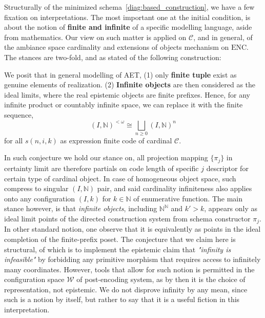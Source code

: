 Structurally of the minimized schema~\ref{diag:based_construction}, we have a few fixation on interpretations. The most important one at the initial condition, is about the notion of \textbf{finite and infinite} of a specific modelling language, aside from mathematics. Our view on such matter is applied on $\mathcal{C}$, and in general, of the ambiance space cardinality and extensions of objects mechanism on $\mathrm{ENC}$. The stances are two-fold, and as stated of the following construction:
\begin{conjecture}
	We posit that in general modelling of AET, (1) only \textbf{finite tuple} exist as genuine elements of realization. (2) \textbf{Infinite objects} are then considered as the ideal limits, where the real epistemic objects are finite prefixes. Hence, for any infinite product or countably infinite space, we can replace it with the finite sequence, 
	\begin{equation}
		(I,\mathbb{N})^{<\omega} \cong \bigsqcup_{n\geq 0} (I,\mathbb{N})^{n}
	\end{equation}
	for all $s(n,i,k)$ as expression finite code of cardinal $\mathcal{C}$. 
\end{conjecture} 

In such conjecture we hold our stance on, all projection mapping $\{\pi_{j}\}$ in certainty limit are therefore partials on code length of specific $j$ descriptor for certain type of cardinal object. In case of homogeneous object space, such compress to singular $(I,\mathbb{N})$ pair, and said cardinality infiniteness also applies onto any configuration $(I,k)$ for $k\in\mathbb{N}$ of enumerative function. The main stance however, is that \textit{infinite objects}, including $\mathbb{N}^{\mathbb{N}}$ and $k'>k$, appears only as ideal limit points of the directed construction system from schema constructor $\pi_{j}$. In other standard notion, one observe that it is equivalently as points in the ideal completion of the finite-prefix poset. The conjecture that we claim here is structural, of which is to implement the epistemic claim that \textit{"infinity is infeasible"} by forbidding any primitive morphism that requires access to infinitely many coordinates. However, tools that allow for such notion is permitted in the configuration space $\mathcal{W}$ of post-encoding system, as by then it is the choice of representation, not epistemic. We do not disprove infinity by any mean, since such is a notion by itself, but rather to say that it is a useful fiction in this interpretation. 

